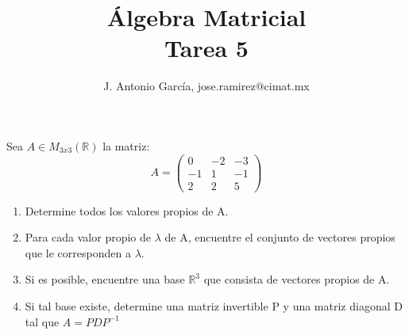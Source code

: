\documentclass[letter]{memoir} %
\newenvironment{cframed}[1][blue]
  {\begin{tcolorbox}[colframe=#1,colback=white]}
  {\end{tcolorbox}}
\begin{document}
\title{Álgebra Matricial\\
\large{Tarea 5  }}
\author{ J. Antonio García, jose.ramirez@cimat.mx}

\maketitle
\begin{enumerate}
\begin{cframed}[violet]
\item 
 Sea $A \in M_{3x3}(\mathbb{R})$ la matriz:\\
\[
A = \begin{pmatrix}
	0&-2&-3\\
	-1&1&-1\\
	2&2&5
	\end{pmatrix}
\]
\begin{enumerate}
\item Determine todos los valores propios de A.
\item Para cada valor propio de $\lambda$ de A, encuentre el conjunto de vectores propios que le corresponden a $\lambda$.
\item Si es posible, encuentre una base $\mathbb{R}^3$ que consista de vectores propios de A.
\item Si tal base existe, determine una matriz invertible P y una matriz diagonal D tal que $A=PDP^{-1}$
\end{enumerate}
\end{cframed}


\end{enumerate}
\end{document}
